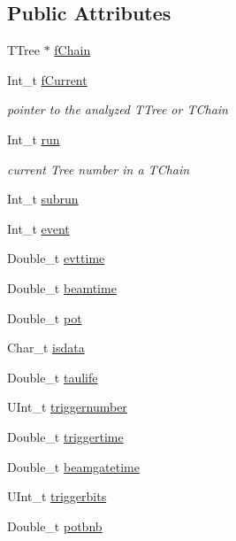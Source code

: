 \subsection*{Public Attributes}
\begin{DoxyCompactItemize}
\item 
T\-Tree $\ast$ \hyperlink{classanatree_af66156eb0d5e2f8c75c79968df2274c2}{f\-Chain}
\item 
Int\-\_\-t \hyperlink{classanatree_af169b259e33ec8cac5f15528f1b665ac}{f\-Current}
\begin{DoxyCompactList}\small\item\em pointer to the analyzed T\-Tree or T\-Chain \end{DoxyCompactList}\item 
Int\-\_\-t \hyperlink{classanatree_a2276c94745faac374d25627c1f62b21a}{run}
\begin{DoxyCompactList}\small\item\em current Tree number in a T\-Chain \end{DoxyCompactList}\item 
Int\-\_\-t \hyperlink{classanatree_a547be48aea7822a67d3480a67b4020b1}{subrun}
\item 
Int\-\_\-t \hyperlink{classanatree_af0190b2eea3485d9c3c1d3f41e1ec23f}{event}
\item 
Double\-\_\-t \hyperlink{classanatree_afb7cadab695f3519210673ba0b55777b}{evttime}
\item 
Double\-\_\-t \hyperlink{classanatree_ada6a190fae7a7b06d5bebd0306831f0d}{beamtime}
\item 
Double\-\_\-t \hyperlink{classanatree_a938fbc01abb82fb428125d22da9b4fb1}{pot}
\item 
Char\-\_\-t \hyperlink{classanatree_a659847e73060356ccfb88a6df2d5cd5d}{isdata}
\item 
Double\-\_\-t \hyperlink{classanatree_a90b726f75319f37dfbaee9e686e22a03}{taulife}
\item 
U\-Int\-\_\-t \hyperlink{classanatree_a69ac24922aa2a34dcefe468b811de0ba}{triggernumber}
\item 
Double\-\_\-t \hyperlink{classanatree_ac4405283b1417b54efb3a249080cae37}{triggertime}
\item 
Double\-\_\-t \hyperlink{classanatree_a198384c3b69a8ebe70be4b1dbecbb9d2}{beamgatetime}
\item 
U\-Int\-\_\-t \hyperlink{classanatree_a846894b838aa8c620d1b1f4a832fab02}{triggerbits}
\item 
Double\-\_\-t \hyperlink{classanatree_aa7865de80f9dc7516d7c1ac5c166fc11}{potbnb}

\end{DoxyCompactItemize}
